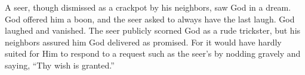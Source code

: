 
A seer, though dismissed as a crackpot by his neighbors, saw God in a
dream. God offered him a boon, and the seer asked to always have the
last laugh. God laughed and vanished. The seer publicly scorned God as a
rude trickster, but his neighbors assured him God delivered as promised.
For it would have hardly suited for Him to respond to a request such as
the seer's by nodding gravely and saying, ``Thy wish is granted.''
